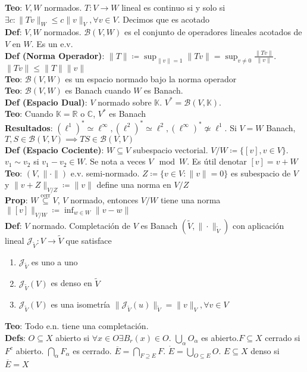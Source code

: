 \documentclass[9pt]{extarticle}
\newcommand{\C}{\mathbb{C}}
\newcommand{\R}{\mathbb{R}}
\newcommand{\K}{\mathbb{K}}
\begin{document}
\begin{multicols*}{2}
\textbf{Teo}: $V,W$ normados. $T:V\to W$ lineal es continuo si y solo si $\exists c:\|Tv\|_W\leq c\|v\|_V,\forall v\in V$. Decimos que es acotado\\
\textbf{Def}: $V,W$ normados. $\mathcal{B}(V,W)$ es el conjunto de operadores lineales acotados de $V$ en $W$. Es un e.v.\\
\textbf{Def (Norma Operador)}: $\|T\|\coloneqq \sup_{\|v\|=1}\|Tv\|=\sup_{v\neq 0}\frac{\|Tv\|}{\|v\|}$. $\|Tv\|\leq \|T\|\|v\|$\\
\textbf{Teo}: $\mathcal{B}(V,W)$ es un espacio normado bajo la norma operador\\
\textbf{Teo}: $\mathcal{B}(V,W)$ es Banach cuando $W$ es Banach.\\
\textbf{Def (Espacio Dual)}: $V$ normado sobre $\K$. $V^*=\mathcal{B}(V,\K)$.\\
\textbf{Teo}: Cuando $\K=\R\text{ o }\C$, $V^*$ es Banach\\
\textbf{Resultados}: $(\ell^1)^*\simeq \ell^\infty,(\ell^2)^*\simeq \ell^2,(\ell^\infty)^*\not\simeq\ell^1$. Si $V=W$ Banach, $T,S\in \mathcal{B}(V,V)\implies TS\in \mathcal{B}(V,V)$\\
\textbf{Def (Espacio Cociente)}: $W\subseteq V$ subespacio vectorial. $V/W\coloneqq \{[v],v\in V\}$. $v_1\sim v_2$ si $v_1-v_2\in W$. Se nota a veces $V\mod W$. Es útil denotar $[v]=v+W$\\
\textbf{Teo}: $(V,\|\cdot\|)$ e.v. semi-normado. $Z\coloneqq \{v\in V:\|v\|=0\}$ es subespacio de $V$ y $\|v+Z\|_{V/Z}\coloneqq \|v\|$ define una norma en $V/Z$\\
\textbf{Prop}: $W\overset{\text{cerr}}{\subseteq}V$, $V$ normado, entonces $V/W$ tiene una norma $\|[v]\|_{V/W}\coloneqq \inf_{w\in W}\|v-w\|$\\
\textbf{Def}: $V$ normado. Completación de $V$ es Banach $(\tilde V,\|\cdot\|_{\tilde V})$ con aplicación lineal $\mathcal{J}_{\tilde V}:V\to \tilde V$ que satisface
\begin{enumerate}
	\item $\mathcal{J}_{\tilde V}$ es uno a uno
	\item $\mathcal{J}_{\tilde V}(V)$ es denso en $\tilde V$
	\item $\mathcal{J}_{\tilde V}(V)$ es una isometría $\|\mathcal{J}_{\tilde V}(u)\|_{\tilde V}=\|v\|_V,\forall v\in V$
\end{enumerate}
\textbf{Teo}: Todo e.n. tiene una completación.\\
\textbf{Defs}: $O\subseteq X$ abierto si $\forall x\in O\exists B_r(x)\in O$. $\bigcup_\alpha O_\alpha$ es abierto.$F\subseteq X$ cerrado si $F^c$ abierto. $\bigcap_\alpha F_\alpha$ es cerrado. $\overline E=\bigcap_{F\supseteq E}F$. $\mathring{E}=\bigcup_{O\subseteq E} O$. $E\subseteq X$ denso si $\overline{E}=X$\\

\end{multicols*}
\end{document}
